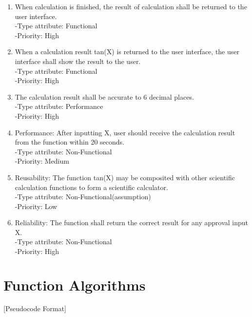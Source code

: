 \documentclass[12pt]{article}
\begin{document}
\begin{enumerate}
\item	When calculation is finished, the result of calculation shall be returned to the user interface.	\\
-Type attribute: Functional\\
-Priority: High\\

\item	When a calculation result tan(X) is returned to the user interface, the user interface shall show the result to the user.\\
-Type attribute: Functional\\
-Priority: High\\

\item	The calculation result shall be accurate to 6 decimal places.\\
-Type attribute: Performance\\
-Priority: High\\

\item	Performance:
After inputting X, user should receive the calculation result from the function within 20 seconds.\\
-Type attribute: Non-Functional\\
-Priority: Medium\\

\item	Reusability:
The function tan(X) may be composited with other scientific calculation functions to form a scientific calculator.\\
-Type attribute: Non-Functional(assumption)\\
-Priority: Low\\

\item	Reliability:
The function shall return the correct result for any approval input X.\\	-Type attribute: Non-Functional\\
-Priority: High\\

\end{enumerate}


\section{Function Algorithms}


[Pseudocode Format]\\
\end{document}
